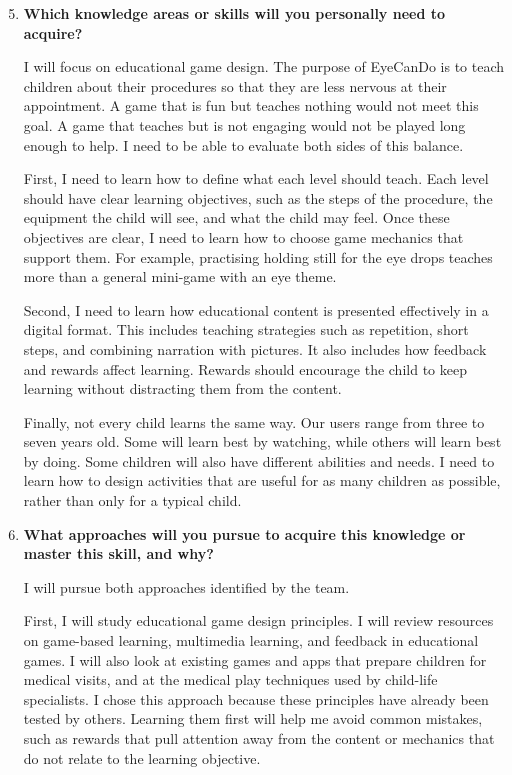 \documentclass[12pt]{article}
\begin{document}
\begin{enumerate}
    \setcounter{enumi}{4}

    \item \textbf{Which knowledge areas or skills will you personally
    need to acquire?}

    I will focus on educational game design. The purpose of EyeCanDo
    is to teach children about their procedures so that they are less
    nervous at their appointment. A game that is fun but teaches
    nothing would not meet this goal. A game that teaches but is not
    engaging would not be played long enough to help. I need to be
    able to evaluate both sides of this balance.

    First, I need to learn how to define what each level should teach.
    Each level should have clear learning objectives, such as the steps
    of the procedure, the equipment the child will see, and what the
    child may feel. Once these objectives are clear, I need to learn
    how to choose game mechanics that support them. For example,
    practising holding still for the eye drops teaches more than a
    general mini-game with an eye theme.

    Second, I need to learn how educational content is presented
    effectively in a digital format. This includes teaching strategies
    such as repetition, short steps, and combining narration with
    pictures. It also includes how feedback and rewards affect
    learning. Rewards should encourage the child to keep learning
    without distracting them from the content.

    Finally, not every child learns the same way. Our users range from
    three to seven years old. Some will learn best by watching, while
    others will learn best by doing. Some children will also have
    different abilities and needs. I need to learn how to design
    activities that are useful for as many children as possible,
    rather than only for a typical child.

    \item \textbf{What approaches will you pursue to acquire this
    knowledge or master this skill, and why?}

    I will pursue both approaches identified by the team.

    First, I will study educational game design principles. I will
    review resources on game-based learning, multimedia learning, and
    feedback in educational games. I will also look at existing games
    and apps that prepare children for medical visits, and at the
    medical play techniques used by child-life specialists. I chose
    this approach because these principles have already been tested
    by others. Learning them first will help me avoid common mistakes,
    such as rewards that pull attention away from the content or
    mechanics that do not relate to the learning objective.


\end{enumerate}
\end{document}
